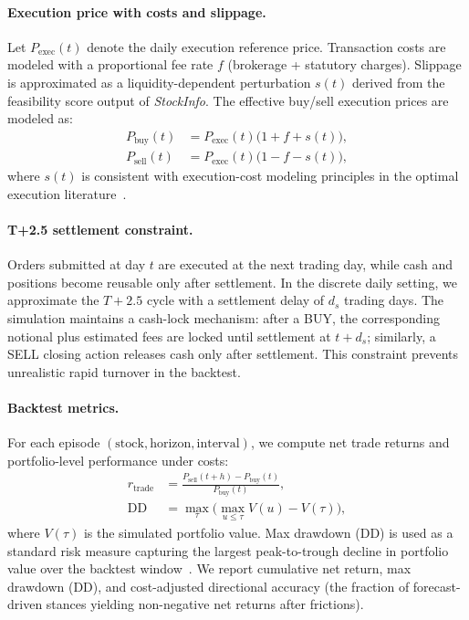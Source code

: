 \documentclass{ieeeaccess}
\begin{document}
\paragraph{Execution price with costs and slippage.}
Let $P_{\text{exec}}(t)$ denote the daily execution reference price. Transaction costs are modeled with a proportional fee rate $f$ (brokerage + statutory charges). Slippage is approximated as a liquidity-dependent perturbation $s(t)$ derived from the feasibility score output of \textit{StockInfo}. The effective buy/sell execution prices are modeled as:
\begin{align}
P_{\text{buy}}(t) &= P_{\text{exec}}(t)\big(1+f+s(t)\big),\\
P_{\text{sell}}(t) &= P_{\text{exec}}(t)\big(1-f-s(t)\big),
\end{align}
where $s(t)$ is consistent with execution-cost modeling principles in the optimal execution literature~\cite{almgren2001optimal}.

\paragraph{T+2.5 settlement constraint.}
Orders submitted at day $t$ are executed at the next trading day, while cash and positions become reusable only after settlement. In the discrete daily setting, we approximate the $T+2.5$ cycle with a settlement delay of $d_s$ trading days. The simulation maintains a cash-lock mechanism: after a BUY, the corresponding notional plus estimated fees are locked until settlement at $t+d_s$; similarly, a SELL closing action releases cash only after settlement. This constraint prevents unrealistic rapid turnover in the backtest.

\paragraph{Backtest metrics.}
For each episode $(\text{stock},\text{horizon},\text{interval})$, we compute net trade returns and portfolio-level performance under costs:
\begin{align}
r_{\text{trade}} &= \frac{P_{\text{sell}}(t+h)-P_{\text{buy}}(t)}{P_{\text{buy}}(t)},\\
\text{DD} &= \max_{\tau}\Big(\max_{u\le \tau} V(u) - V(\tau)\Big), 
\end{align}
where $V(\tau)$ is the simulated portfolio value. Max drawdown (DD) is used as a standard risk measure capturing the largest peak-to-trough decline in portfolio value over the backtest window~\cite{magdon2004maxdrawdown}. We report cumulative net return, max drawdown (DD), and cost-adjusted directional accuracy (the fraction of forecast-driven stances yielding non-negative net returns after frictions).
\end{document}
